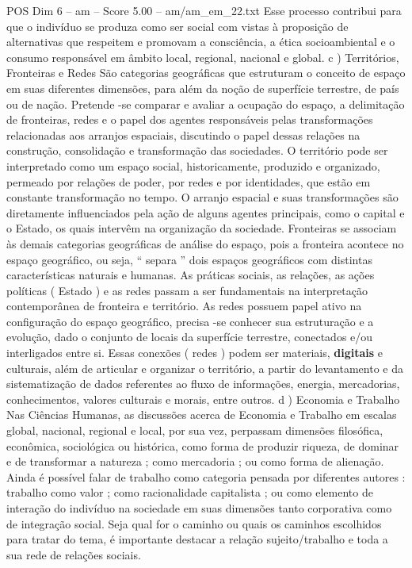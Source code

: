 \begin{textsample}{POS Dim 6 – am – Score 5.00 – am/am\_em\_22.txt}
Esse processo contribui para que o indivíduo se produza como ser social com vistas à proposição de alternativas que respeitem e promovam a consciência, a ética socioambiental e o consumo responsável em âmbito local, regional, nacional e global. c ) Territórios, Fronteiras e Redes São categorias geográficas que estruturam o conceito de espaço em suas diferentes dimensões, para além da noção de superfície terrestre, de país ou de nação.
Pretende -se comparar e avaliar a ocupação do espaço, a delimitação de fronteiras, redes e o papel dos agentes responsáveis pelas transformações relacionadas aos arranjos espaciais, discutindo o papel dessas relações na construção, consolidação e transformação das sociedades.
O território pode ser interpretado como um espaço social, historicamente, produzido e organizado, permeado por relações de poder, por redes e por identidades, que estão em constante transformação no tempo.
O arranjo espacial e suas transformações são diretamente influenciados pela ação de alguns agentes principais, como o capital e o Estado, os quais intervêm na organização da sociedade.
Fronteiras se associam às demais categorias geográficas de análise do espaço, pois a fronteira acontece no espaço geográfico, ou seja, “ separa ” dois espaços geográficos com distintas características naturais e humanas.
As práticas sociais, as relações, as ações políticas ( Estado ) e as redes passam a ser fundamentais na interpretação contemporânea de fronteira e território.
As redes possuem papel ativo na configuração do espaço geográfico, precisa -se conhecer sua estruturação e a evolução, dado o conjunto de locais da superfície terrestre, conectados e/ou interligados entre si.
Essas conexões ( redes ) podem ser materiais, \textbf{digitais} e culturais, além de articular e organizar o território, a partir do levantamento e da sistematização de dados referentes ao fluxo de informações, energia, mercadorias, conhecimentos, valores culturais e morais, entre outros. d ) Economia e Trabalho Nas Ciências Humanas, as discussões acerca de Economia e Trabalho em escalas global, nacional, regional e local, por sua vez, perpassam dimensões filosófica, econômica, sociológica ou histórica, como forma de produzir riqueza, de dominar e de transformar a natureza ; como mercadoria ; ou como forma de alienação.
Ainda é possível falar de trabalho como categoria pensada por diferentes autores : trabalho como valor ; como racionalidade capitalista ; ou como elemento de interação do indivíduo na sociedade em suas dimensões tanto corporativa como de integração social.
Seja qual for o caminho ou quais os caminhos escolhidos para tratar do tema, é importante destacar a relação sujeito/trabalho e toda a sua rede de relações sociais.

\end{textsample}
